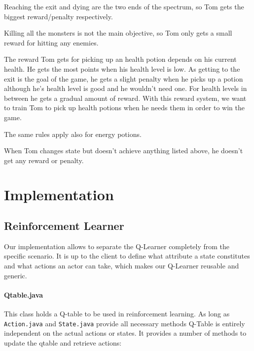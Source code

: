 \documentclass[a4paper,10pt]{scrartcl}
\begin{document}
Reaching the exit and dying are the two ends of the spectrum, so Tom gets the biggest reward/penalty respectively.

Killing all the monsters is not the main objective, so Tom only gets a small reward for hitting any enemies.

The reward Tom gets for picking up an health potion depends on his current health. He gets the most points when his health level is low. As getting to the exit is the goal of the game, he gets a slight penalty when he picks up a potion although he's health level is good and he wouldn't need one. 
For health levels in between he gets a gradual amount of reward. 
With this reward system, we want to train Tom to pick up health potions when he needs them in order to win the game.
 
The same rules apply also for energy potions. 

When Tom changes state but doesn't achieve anything listed above, he doesn't get any reward or penalty. 


\section{Implementation}\label{sec:implementation}
\subsection{Reinforcement Learner}
Our implementation allows to separate the Q-Learner completely from the specific scenario. It is up to the client to define what attribute a state constitutes and what actions an actor can take, which makes our Q-Learner reusable and generic. 

\paragraph{Qtable.java}
This class holds a Q-table to be used in reinforcement learning. As long as \verb|Action.java| and \verb|State.java| provide all necessary methods Q-Table is entirely independent on the actual actions or states. It provides a number of methods to update the qtable and retrieve actions:
\end{document}
